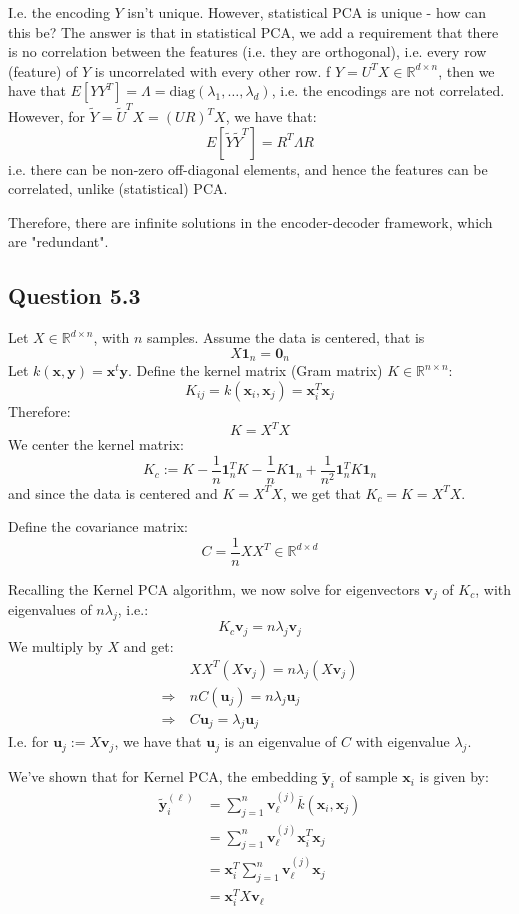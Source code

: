 \documentclass{article}
\begin{document}
I.e. the encoding $Y$ isn't unique.  
However, statistical PCA is unique - how can this be? 
The answer is that in statistical PCA, we add a requirement that there is no correlation between the features (i.e. they are orthogonal), i.e. every row (feature) of $Y$ is uncorrelated with every other row. 
 f $Y = U^{T} X \in \mathbb{R}^{d \times  n}$, then we have that $E[Y Y ^{T}] = \Lambda = \text{diag}(\lambda_1, \ldots, \lambda_{d})$, i.e. the encodings are not correlated. 
However, for $\widetilde{Y} = \widetilde{U}^{T} X = (UR)^{T} X$, we have that:
\[
  E[\widetilde{Y} \widetilde{Y}^{T} ] = R^{T} \Lambda R
\]
i.e. there can be non-zero off-diagonal elements, and hence the features can be  correlated, unlike (statistical) PCA. 

Therefore, there are infinite solutions in the encoder-decoder framework, which are "redundant". 

\subsection*{Question 5.3}
Let $X \in \mathbb{R}^{d \times n}$, with $n$ samples. Assume the data is centered, that is
\[
  X \bm{1}_{n} = \bm{0}_{n}
\]
Let $k(\bm{x},\bm{y}) = \bm{x}^{t} \bm{y}$. Define the kernel matrix (Gram matrix) $K \in \mathbb{R}^{n \times n}$:
\[
  K_{ij} = k(\bm{x}_i, \bm{x}_j) = \bm{x}_i ^{T} \bm{x}_j
\]
Therefore:
\[
  K = X^{T} X
\]
We center the kernel matrix:
\[
  K_{c} := K - \frac{1}{n} \bm{1}_{n} ^{T} K - \frac{1}{n} K \bm{1}_{n} + \frac{1}{n ^2} \bm{1}_{n} ^{T} K \bm{1}_{n}
\]
and since the data is centered and $K = X^{T}X$, we get that $K_{c} =K = X^{T}X$. 

Define the covariance matrix:
\[
  C = \frac{1}{n} X X^{T} \in \mathbb{R}^{d \times d}
\]

Recalling the Kernel PCA algorithm, we now solve for eigenvectors $\bm{v}_{j}$ of $K_{c}$, with eigenvalues of $n \lambda_{j}$, i.e.:
\[
  K_{c} \bm{v}_j = n \lambda_j \bm{v}_j
\]
We multiply by $X$ and get:
\begin{align*}
  & X X ^{T} (X \bm{v}_j) = n \lambda_j (X \bm{v}_j) \\
  \Rightarrow \  & nC (\bm{u}_j)  = n \lambda_j \bm{u}_j \\
  \Rightarrow \ & C \bm{u}_j = \lambda_j \bm{u}_j
\end{align*}
I.e. for $\bm{u}_j := X \bm{v}_j$, we have that $\bm{u}_j$ is an eigenvalue of $C$ with eigenvalue $\lambda_j$. 

We've shown that for Kernel PCA, the embedding $\widetilde{\bm{y}}_i$ of sample $\bm{x}_i$ is given by:
\begin{align*}
  \widetilde{\bm{y}}_i^{(\ell)} &= \sum_{j=1}^{n} \bm{v}_\ell^{(j)} \overline{k} (\bm{x}_i, \bm{x}_j) \\
  &= \sum_{j=1}^{n} \bm{v}_\ell^{(j)} \bm{x}_i^{T} \bm{x}_j \\
  &= \bm{x}_i^{T} \sum_{j=1}^{n} \bm{v}_\ell^{(j)} \bm{x}_j \\
  &= \bm{x}_i ^{T} X \bm{v}_{\ell}
\end{align*}
\end{document}
